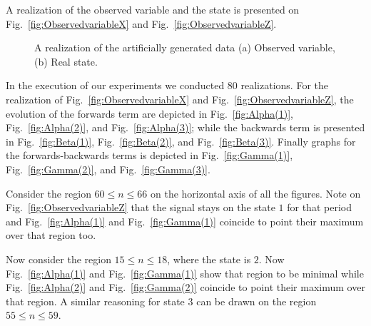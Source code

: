 \documentclass[letterpaper, 10 pt, conference]{ieeeconf}  %
\begin{document}
A realization of the observed variable and the state is presented on Fig.~\ref{fig:ObservedvariableX} and Fig.~\ref{fig:ObservedvariableZ}.
\begin{figure}[ht!]
 \begin{center}
         \caption{A realization of the artificially generated data  (a) Observed variable, (b) Real state. }
 \end{center}
\end{figure}

In the execution of our experiments we conducted $80$ realizations. For the realization of Fig.~\ref{fig:ObservedvariableX} and Fig.~\ref{fig:ObservedvariableZ}, the evolution of the forwards term are depicted in Fig.~\ref{fig:Alpha(1)}, Fig.~\ref{fig:Alpha(2)}, and Fig.~\ref{fig:Alpha(3)}; while the backwards term is presented in Fig.~\ref{fig:Beta(1)}, Fig.~\ref{fig:Beta(2)}, and Fig.~\ref{fig:Beta(3)}. Finally graphs for the forwards-backwards terms is depicted in Fig.~\ref{fig:Gamma(1)}, Fig.~\ref{fig:Gamma(2)}, and Fig.~\ref{fig:Gamma(3)}.

Consider the region $60 \leq n \leq 66$ on the horizontal axis of all the figures. Note on Fig.~\ref{fig:ObservedvariableZ} that the signal stays on the state $1$ for that period and   Fig.~\ref{fig:Alpha(1)} and Fig.~\ref{fig:Gamma(1)} coincide to point their maximum over that region too.

Now consider  the region $15 \leq n \leq 18$, where the state is $2$. Now Fig.~\ref{fig:Alpha(1)} and Fig.~\ref{fig:Gamma(1)} show that region to be minimal while Fig.~\ref{fig:Alpha(2)} and Fig.~\ref{fig:Gamma(2)} coincide to point their maximum over that region. A similar reasoning for state $3$ can be drawn on the region  $55 \leq n \leq 59$.
\end{document}
